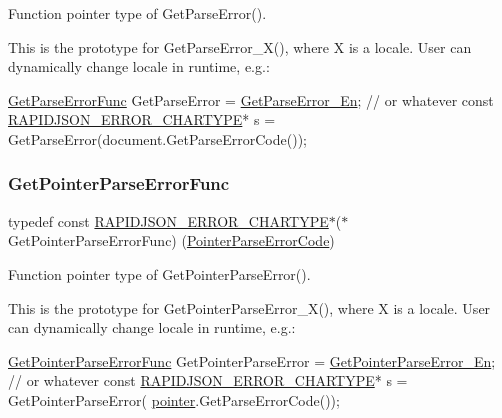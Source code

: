 Function pointer type of Get\+Parse\+Error(). 

This is the prototype for {\ttfamily Get\+Parse\+Error\+\_\+\+X()}, where {\ttfamily X} is a locale. User can dynamically change locale in runtime, e.\+g.\+: 
\begin{DoxyCode}
\hyperlink{group__RAPIDJSON__ERRORS_ga586548166441ab3ce30219cb35be2e04}{GetParseErrorFunc} GetParseError = \hyperlink{group__RAPIDJSON__ERRORS_ga755b523205f46c980c80d12e230a3abd}{GetParseError\_En}; \textcolor{comment}{// or whatever}
\textcolor{keyword}{const} \hyperlink{group__RAPIDJSON__ERRORS_ga7e4636fd48d0148f102b8a13f0539d8c}{RAPIDJSON\_ERROR\_CHARTYPE}* s = GetParseError(document.GetParseErrorCode());
\end{DoxyCode}
 \mbox{\label{group__RAPIDJSON__ERRORS_gae35ad6c3a9795985203c66648026e991}} 
\subsubsection{\texorpdfstring{Get\+Pointer\+Parse\+Error\+Func}{GetPointerParseErrorFunc}}
{\footnotesize\ttfamily typedef const \hyperlink{group__RAPIDJSON__ERRORS_ga7e4636fd48d0148f102b8a13f0539d8c}{R\+A\+P\+I\+D\+J\+S\+O\+N\+\_\+\+E\+R\+R\+O\+R\+\_\+\+C\+H\+A\+R\+T\+Y\+PE}$\ast$($\ast$ Get\+Pointer\+Parse\+Error\+Func) (\hyperlink{group__RAPIDJSON__ERRORS_gacb2e274f33e54d91b96e9883a99a98be}{Pointer\+Parse\+Error\+Code})}



Function pointer type of Get\+Pointer\+Parse\+Error(). 

This is the prototype for {\ttfamily Get\+Pointer\+Parse\+Error\+\_\+\+X()}, where {\ttfamily X} is a locale. User can dynamically change locale in runtime, e.\+g.\+: 
\begin{DoxyCode}
\hyperlink{group__RAPIDJSON__ERRORS_gae35ad6c3a9795985203c66648026e991}{GetPointerParseErrorFunc} GetPointerParseError = 
      \hyperlink{group__RAPIDJSON__ERRORS_gab0c2320924fc7f2cdca02a4ce104fd8e}{GetPointerParseError\_En}; \textcolor{comment}{// or whatever}
\textcolor{keyword}{const} \hyperlink{group__RAPIDJSON__ERRORS_ga7e4636fd48d0148f102b8a13f0539d8c}{RAPIDJSON\_ERROR\_CHARTYPE}* s = GetPointerParseError(
      \hyperlink{imgui__impl__opengl3__loader_8h_aae1f8d263916ad71bd415381591549c0}{pointer}.GetParseErrorCode());
\end{DoxyCode}
 \mbox{\label{group__RAPIDJSON__ERRORS_ga27925387f15027c190cfd8411c4a3535}} 
